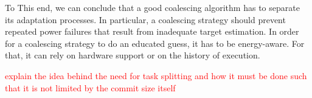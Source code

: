 To This end, we can conclude that a good coalescing algorithm has to separate its adaptation processes. In particular, a coalescing strategy should prevent repeated power failures that result from inadequate target estimation. In order for a coalescing strategy to do an educated guess, it has to be energy-aware. For that, it can rely on hardware support or on the history of execution. 

\textcolor{red}{explain the idea behind the need for task splitting and how it must be done such that it is not limited by the commit size itself}
